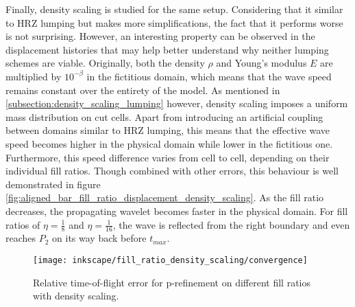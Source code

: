 Finally, density scaling is studied for the same setup. Considering that it similar to HRZ lumping but makes more simplifications, the fact that it performs worse is not surprising. However, an interesting property can be observed in the displacement histories that may help better understand why neither lumping schemes are viable. Originally, both the density $\rho$ and Young's modulus $E$ are multiplied by $10^{-\beta}$ in the fictitious domain, which means that the wave speed remains constant over the entirety of the model. As mentioned in \ref{subsection:density_scaling_lumping} however, density scaling imposes a uniform mass distribution on cut cells. Apart from introducing an artificial coupling between domains similar to HRZ lumping, this means that the effective wave speed becomes higher in the physical domain while lower in the fictitious one. Furthermore, this speed difference varies from cell to cell, depending on their individual fill ratios. Though combined with other errors, this behaviour is well demonstrated in figure \ref{fig:aligned_bar_fill_ratio_displacement_density_scaling}. As the fill ratio decreases, the propagating wavelet becomes faster in the physical domain. For fill ratios of $\eta=\frac{1}{8}$ and $\eta=\frac{1}{16}$, the wave is reflected from the right boundary and even reaches $P_2$ on its way back before $t_{max}$.

\begin{figure}[!h]
	\centering
	\texttt{[image: inkscape/fill\_ratio\_density\_scaling/convergence]}
	\caption{Relative time-of-flight error for p-refinement on different fill ratios with density scaling.}
	\label{fig:aligned_bar_fill_ratio_convergence_density_scaling}
\end{figure}

